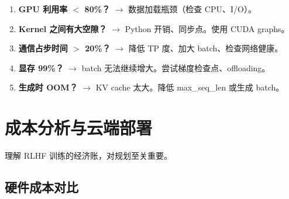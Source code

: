 \begin{examplebox}
\begin{enumerate}
  \item \textbf{GPU 利用率 $<$ 80\%？} $\rightarrow$ 数据加载瓶颈（检查 CPU、I/O）。
  \item \textbf{Kernel 之间有大空隙？} $\rightarrow$ Python 开销、同步点。使用 CUDA graphs。
  \item \textbf{通信占步时间 $>$ 20\%？} $\rightarrow$ 降低 TP 度、加大 batch、检查网络健康。
  \item \textbf{显存 99\%？} $\rightarrow$ batch 无法继续增大。尝试梯度检查点、offloading。
  \item \textbf{生成时 OOM？} $\rightarrow$ KV cache 太大。降低 max\_seq\_len 或生成 batch。
\end{enumerate}
\end{examplebox}

\section{成本分析与云端部署}
\label{cost-analysis-and-cloud-deployment}

理解 RLHF 训练的经济账，对规划至关重要。

\subsection{硬件成本对比}
\label{hardware-cost-comparison}

